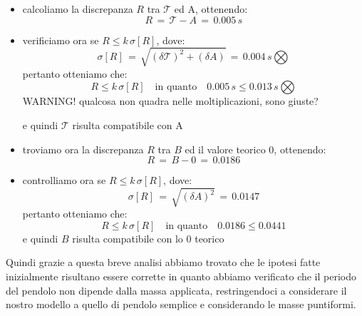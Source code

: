 \begin{itemize}
	\item{calcoliamo la discrepanza $R$ tra $\mathcal{T}$ ed A, ottenendo:
			\begin{equation*}
				R \,=\, \mathcal{T} - A \,=\, 0.005 \,s
			\end{equation*}
			}
	\item{verificiamo ora se $R \leq k\,\sigma[R]$, dove:
			\begin{equation*}
				\sigma[R] \,=\, \sqrt{(\delta \mathcal{T})^2 + (\delta A)} \,=\, 0.004  \, s \bigotimes
			\end{equation*}
			pertanto otteniamo che:
			\begin{equation*}
				R \leq k\,\sigma[R] \quad \text{in quanto} \quad 0.005 \, s \leq 0.013 \, s \bigotimes
			\end{equation*}
WARNING! qualcosa non quadra nelle moltiplicazioni, sono giuste?			
			
			e quindi $\mathcal{T}$ risulta compatibile con A}
	\item{troviamo ora la discrepanza $R$ tra $B$ ed il valore teorico 0, ottenendo:
			\begin{equation*}
				R \,=\, B - 0 \,=\, 0.0186
			\end{equation*}
			}
	\item{controlliamo ora se $R \leq k\,\sigma[R]$, dove:
			\begin{equation*}
				\sigma[R] \,=\, \sqrt{(\delta A)^2} \,=\, 0.0147	
			\end{equation*}
			pertanto otteniamo che:
			\begin{equation*}
				R \leq k\,\sigma[R] \quad \text{in quanto} \quad 0.0186 \leq 0.0441
			\end{equation*}
			e quindi $B$ risulta compatibile con lo 0 teorico}			
\end{itemize}
Quindi grazie a questa breve analisi abbiamo trovato che le ipotesi fatte inizialmente risultano essere corrette in quanto abbiamo verificato che il periodo del pendolo non dipende dalla massa applicata, restringendoci a considerare il nostro modello a quello di pendolo semplice e considerando le masse puntiformi.

